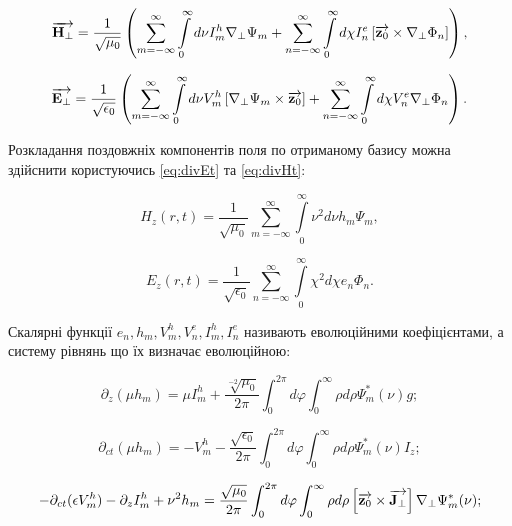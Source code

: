 \begin{equation}
\overrightarrow{\mathbf H_\perp} = \frac{1}{\sqrt{\mu_0}} \left( 
\sum \limits_{m=-\infty}^{\infty} \int \limits_{0}^{\infty} d \nu
I_m^h \nabla_\perp \Psi_m + \sum \limits_{n=-\infty}^{\infty}
\int \limits_{0}^{\infty} d \chi I_n^e 
\left[ \overrightarrow{\mathbf z_0} \times \nabla_\perp \Phi_n \right] \right),
\end{equation}

\begin{equation} 
\overrightarrow{\mathbf E_\perp} = \frac{1}{\sqrt{\epsilon_0}} \left( 
\sum \limits_{m=-\infty}^{\infty} \int \limits_{0}^{\infty} 
d \nu V_m^h \left[  \nabla_\perp \Psi_m  \times  \overrightarrow{\mathbf z_0}  \right] +
\sum \limits_{n=-\infty}^{\infty} \int \limits_{0}^{\infty}
d \chi V_n^e \nabla_\perp \Phi_n \right).
\end{equation}

Розкладання поздовжніх компонентів поля по отриманому базису можна здійснити
користуючись \eqref{eq:divEt} та \eqref{eq:divHt}:

\begin{equation} 
H_z (r,t) = \frac{1}{\sqrt{\mu_0}} \sum \limits_{m=-\infty}^\infty
\int \limits_0^\infty \nu^2 d \nu h_m \Psi_m,
\end{equation}

\begin{equation} 
E_z (r,t) = \frac{1}{\sqrt{\epsilon_0}} \sum \limits_{n=-\infty}^\infty
\int \limits_0^\infty \chi^2 d \chi e_n \Phi_n.
\end{equation}

Скалярні функції $ e_n, h_m, V_m^h, V_n^e, I_m^h, I_n^e  $ називають 
еволюційними коефіцієнтами, а систему рівнянь що їх визначає еволюційною:

\begin{equation} \label{eq:evo1}
\partial_z (\mu h_m) = \mu I_m^h + \frac{\sqrt[-2]{\mu_0}}{2 \pi}
\int_0^{2\pi} d \varphi \int_0^{\infty} \rho d \rho
\Psi_m^* (\nu) g;
\end{equation}

\begin{equation} \label{eq:evo2}
\partial_{ct} (\mu h_m) = - V_m^h - \frac{\sqrt{\epsilon_0}}{2 \pi}
\int_0^{2\pi} d \varphi \int_0^{\infty} \rho d \rho
\Psi_m^* (\nu) I_z;
\end{equation}

\begin{equation} \label{eq:evo3}
- \partial_{ct} (\epsilon V_m^h) - \partial_z I_m^h + \nu^2 h_m = 
\frac{\sqrt{\mu_0}}{2 \pi} \int_0^{2\pi} d \varphi 
\int_0^{\infty} \rho d \rho \left[ \overrightarrow{\mathbf z_0} \times \overrightarrow{\mathbf J_\perp} \right]
\nabla_\perp \Psi_m^* (\nu);
\end{equation}

